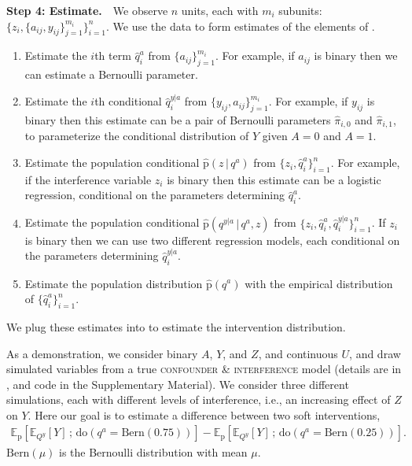 \documentclass[12pt]{article}
\newcommand{\EE}[2]{\mathbb{E}_{#1}\left[ #2 \right]}
\newcommand{\rmdo}{\mathrm{do}}
\newcommand{\s}{\, ; \,}
\newcommand{\g}{\,\vert\,}
\newcommand{\pr}{\mathrm{p}}
\newcommand{\parheadsmall}[1]{\vspace{0.1in} \noindent \textbf{#1} \,\,}
\begin{document}
\parheadsmall{Step 4: Estimate.} We observe $n$ units, each with $m_i$
subunits: $\{z_i, \{a_{ij}, y_{ij}\}_{j=1}^{m_i}\}_{i=1}^n$. We
use the data to form estimates of the elements of
.
\begin{enumerate}[leftmargin=*]
\item Estimate the $i$th term $\hat{q}_i^{a}$ from
  $\{a_{ij}\}_{j=1}^{m_i}$. For example, if $a_{ij}$ is binary then we
  can estimate a Bernoulli parameter.

\item Estimate the $i$th conditional $\hat{q}_i^{y|a}$ from
  $\{y_{ij}, a_{ij}\}_{j=1}^{m_i}$. For example, if $y_{ij}$ is binary
  then this estimate can be a pair of Bernoulli parameters
  $\hat{\pi}_{i,0}$ and $\hat{\pi}_{i,1}$, to parameterize the
  conditional distribution of $Y$ given $A=0$ and $A=1$.

\item Estimate the population conditional $\hat{\pr}(z \g q^a)$ from
  $\{z_i, \hat{q}^a_i\}_{i=1}^n$. For example, if the interference
  variable $z_i$ is binary then this estimate can be a logistic
  regression, conditional on the parameters determining $\hat{q}^a_i$.

\item Estimate the population conditional
  $\hat{\pr}(q^{y|a} \g q^a, z)$ from
  $\{z_i, \hat{q}^a_i, \hat{q}^{y|a}_i\}_{i=1}^n$. If $z_i$ is
  binary then we can use two different regression models, each
  conditional on the parameters determining $\hat{q}^{y|a}_i$.

\item Estimate the population distribution $\hat{\pr}(q^a)$ with the
  empirical distribution of $\{\hat{q}^a_i\}_{i=1}^n$.
\end{enumerate}
We plug these estimates into
 to estimate
the intervention distribution.

As a demonstration, we consider binary $A$, $Y$, and $Z$, and continuous $U$, and draw
simulated variables from a true \textsc{confounder \& interference}
model (details are in , and code in the Supplementary Material). We consider three different simulations, each with different
levels of interference, i.e., an increasing effect of $Z$ on $Y$.  Here our
goal is to estimate a difference between two soft interventions,
\begin{align}
  \EE{\pr}
  {\EE{Q^y}{Y}
  \s \rmdo(q^a = \textrm{Bern}(0.75))} -
  \EE{\pr}
  {\EE{Q^y}{Y}
  \s \rmdo(q^a = \textrm{Bern}(0.25))}.
\end{align}
$\textrm{Bern}(\mu)$ is the Bernoulli distribution with mean $\mu$.
\end{document}
